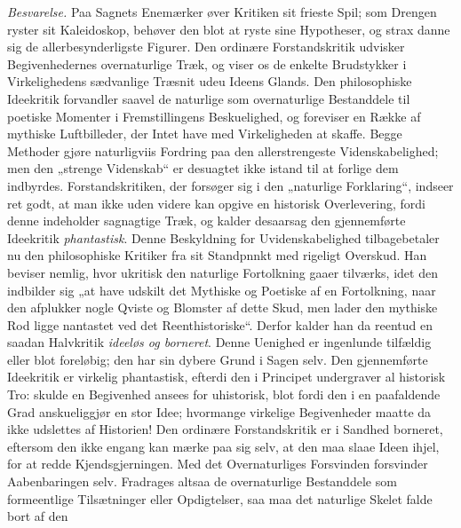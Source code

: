\documentclass[12pt,a4paper]{book}
\begin{document}
\emph{Besvarelse.} Paa Sagnets Enemærker øver Kritiken sit frieste Spil; som
Drengen ryster sit Kaleidoskop, behøver den blot at ryste sine Hypotheser, og
strax danne sig de allerbesynderligste Figurer. Den ordinære Forstandskritik
udvisker Begivenhedernes overnaturlige Træk, og viser os de enkelte Brudstykker
i Virkelighedens sædvanlige Træsnit
udeu Ideens Glands. Den philosophiske Ideekritik forvandler saavel de naturlige
som overnaturlige Bestanddele til poetiske Momenter i Fremstillingens
Beskuelighed, og foreviser en Række af mythiske Luftbilleder, der Intet have med
Virkeligheden at skaffe. Begge Methoder gjøre naturligviis Fordring paa den
allerstrengeste Videnskabelighed; men den „strenge Videnskab“ er desuagtet ikke
istand til at forlige
dem indbyrdes. Forstandskritiken, der forsøger sig i den „naturlige Forklaring“,
indseer ret godt, at man ikke uden videre kan opgive en historisk Overlevering,
fordi denne indeholder sagnagtige Træk, og kalder desaarsag den gjennemførte
Ideekritik \emph{phantastisk}. Denne Beskyldning for Uvidenskabelighed
tilbagebetaler nu den philosophiske Kritiker fra sit
Standpnnkt med rigeligt Overskud. Han beviser nemlig, hvor ukritisk den naturlige
Fortolkning gaaer tilværks, idet den indbilder sig „at have udskilt det Mythiske
og Poetiske af en Fortolkning, naar den afplukker nogle Qviste og Blomster af
dette Skud, men lader den mythiske Rod ligge
nantastet ved det Reenthistoriske“. Derfor kalder han da reentud en saadan
Halvkritik \emph{ideeløs og borneret}. Denne Uenighed er ingenlunde tilfældig
eller blot foreløbig; den har sin dybere Grund i Sagen selv. Den gjennemførte
Ideekritik er virkelig phantastisk, efterdi den i Principet undergraver al
historisk Tro: skulde en Begivenhed ansees for uhistorisk, blot fordi den i en
paafaldende Grad anskueliggjør en stor Idee; hvormange virkelige Begivenheder
maatte da ikke udslettes af Historien! Den ordinære Forstandskritik er i Sandhed
borneret, eftersom den ikke engang kan mærke paa sig selv, at den maa slaae Ideen
ihjel, for at redde Kjendsgjerningen. Med det Overnaturliges Forsvinden forsvinder
Aabenbaringen selv. Fradrages altsaa de overnaturlige Bestanddele som formeentlige
Tilsætninger eller Opdigtelser, saa maa det naturlige Skelet falde bort af den
\end{document}

